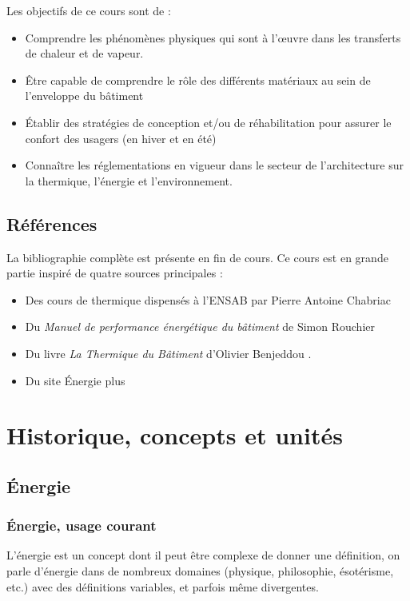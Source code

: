 Les objectifs de ce cours sont de :
\begin{itemize}
    \item Comprendre les phénomènes physiques qui sont à l’œuvre dans les transferts de chaleur et de vapeur.
    \item Être capable de comprendre le rôle des différents matériaux au sein de l'enveloppe du bâtiment
    \item Établir des stratégies de conception et/ou de réhabilitation pour assurer le confort des usagers (en hiver et en été)
    \item Connaître les réglementations en vigueur dans le secteur de l'architecture sur la thermique, l’énergie et l'environnement.

\end{itemize}

\section{Références}
La bibliographie complète est présente en fin de cours. Ce cours est en grande partie inspiré de quatre sources principales :
\begin{itemize}
    \item Des cours de thermique dispensés à l'ENSAB par Pierre Antoine Chabriac
    \item Du \textit{Manuel de performance énergétique du bâtiment} de Simon Rouchier 
    \item Du livre \textit{La Thermique du Bâtiment} d'Olivier Benjeddou .
    \item Du site Énergie plus 
\end{itemize}
\chapter{Historique, concepts et unités}
\label{chap:concepts}

\section{Énergie}

\subsection*{Énergie, usage courant}
L'énergie est un concept dont il peut être complexe de donner une définition, on parle d'énergie dans de nombreux domaines (physique, philosophie, ésotérisme, etc.) avec des définitions variables, et parfois même divergentes.


